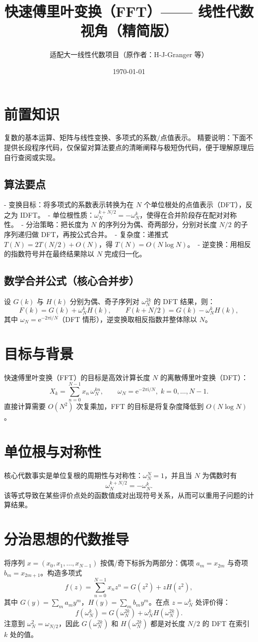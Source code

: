 \documentclass{ctexart}
\title{快速傅里叶变换（FFT）—— 线性代数视角（精简版）}
\author{适配大一线性代数项目（原作者：H-J-Granger 等）}
\date{\today}
\begin{document}
\maketitle

\section{前置知识}
复数的基本运算、矩阵与线性变换、多项式的系数/点值表示。
精要说明：下面不提供长段程序代码，仅保留对算法要点的清晰阐释与极短伪代码，便于理解原理后自行查阅或实现。

\subsection{算法要点}
- 变换目标：将多项式的系数表示转换为在 $N$ 个单位根处的点值表示（DFT），反之为 IDFT。\
- 单位根性质：$\omega_N^{k+N/2}=-\omega_N^k$，使得在合并阶段存在配对对称性。\
- 分治策略：把长度为 $N$ 的序列分为偶、奇两部分，分别对长度 $N/2$ 的子序列递归做 DFT，再按公式合并。\
- 复杂度：递推式 $T(N)=2T(N/2)+O(N)$，得 $T(N)=O(N\log N)$。\
- 逆变换：用相反的指数符号并在最终结果除以 $N$ 完成归一化。

\subsection{数学合并公式（核心合并步）}
设 $G(k)$ 与 $H(k)$ 分别为偶、奇子序列对 $\omega_{N}^{2k}$ 的 DFT 结果，则：
\[
F(k)=G(k)+\omega_N^{k}H(k),\qquad F(k+N/2)=G(k)-\omega_N^{k}H(k),
\]
其中 $\omega_N=\mathrm{e}^{-2\pi\mathrm{i}/N}$（DFT 情形），逆变换取相反指数并整体除以 $N$。

\section{目标与背景}
快速傅里叶变换（FFT）的目标是高效计算长度 $N$ 的离散傅里叶变换（DFT）：
\[
X_k=\sum_{n=0}^{N-1} x_n\,\omega_N^{kn},\qquad\omega_N=\mathrm{e}^{-2\pi\mathrm{i}/N},\;k=0,\dots,N-1.
\]
直接计算需要 $O(N^2)$ 次复乘加，FFT 的目标是将复杂度降低到 $O(N\log N)$。

\section{单位根与对称性}
核心代数事实是单位复根的周期性与对称性：$\omega_N^N=1$，并且当 $N$ 为偶数时有
\[
\omega_N^{k+N/2}=-\omega_N^k.
\]
该等式导致在某些评价点处的函数值成对出现符号关系，从而可以重用子问题的计算结果。

\section{分治思想的代数推导}
将序列 $x=(x_0,x_1,\dots,x_{N-1})$ 按偶/奇下标拆为两部分：偶项 $a_m=x_{2m}$ 与奇项 $b_m=x_{2m+1}$。构造多项式
\[
f(z)=\sum_{n=0}^{N-1} x_n z^n = G(z^2)+zH(z^2),
\]
其中 $G(y)=\sum_m a_m y^m$，$H(y)=\sum_m b_m y^m$。在点 $z=\omega_N^k$ 处评价得：
\[
f(\omega_N^k)=G(\omega_N^{2k})+\omega_N^k H(\omega_N^{2k}).
\]
注意到 $\omega_N^{2}=\omega_{N/2}$，因此 $G(\omega_N^{2k})$ 和 $H(\omega_N^{2k})$ 都是对长度 $N/2$ 的 DFT 在索引 $k$ 处的值。
\end{document}
